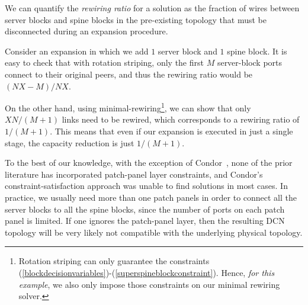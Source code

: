 \documentclass[letterpaper,twocolumn,10pt]{article}
\begin{document}
We can quantify the \emph{rewiring ratio} for a solution as the fraction of wires between server blocks and spine blocks in the pre-existing topology that must be disconnected during an expansion procedure.

Consider an expansion in which we add $1$ server block and $1$ spine block. It is easy to check that with rotation striping, only the first $M$ server-block ports connect to their original peers, and thus the rewiring ratio would be $(NX-M)/NX$.

On the other hand, using minimal-rewiring\footnote{Rotation striping can only guarantee the constraints (\ref{blockdecisionvariables})-(\ref{superspineblockconstraint}). Hence, \emph{for this example}, we also only impose those constraints on our minimal rewiring solver.}, we can show that only $XN/(M+1)$ links need to be rewired, which corresponds to a rewiring ratio of $1/(M+1)$. This means that even if our expansion is executed in just a single stage, the capacity reduction is just $1/(M+1)$.


To the best of our knowledge, with the exception of Condor~\cite{Condor}, none of the prior literature has incorporated patch-panel layer constraints, and Condor's constraint-satisfaction approach was unable to find solutions in most cases. In practice, we usually need more than one patch panels in order to connect all the server blocks to all the spine blocks, since the number of ports on each patch panel is limited. If one ignores the patch-panel layer, then the resulting DCN topology will be very likely not compatible with the underlying physical topology.
\end{document}
